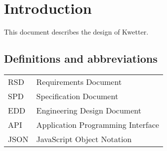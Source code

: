\chapter{Introduction}
This document describes the design of Kwetter.

\section{Definitions and abbreviations}

\begin{tabularx}{\textwidth}{lX}
    RSD & Requirements Document\\
    SPD & Specification Document\\
    EDD & Engineering Design Document\\
    API & Application Programming Interface\\
    JSON & JavaScript Object Notation\\
\end{tabularx}
